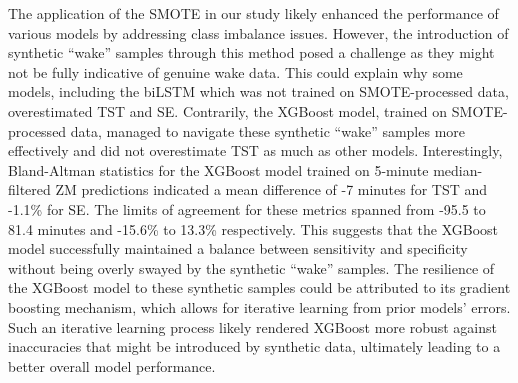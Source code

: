 \documentclass[
  9pt,
]{scrbook}
\begin{document}
The application of the SMOTE in our study likely enhanced the
performance of various models by addressing class imbalance issues.
However, the introduction of synthetic ``wake'' samples through this
method posed a challenge as they might not be fully indicative of
genuine wake data. This could explain why some models, including the
biLSTM which was not trained on SMOTE-processed data, overestimated TST
and SE. Contrarily, the XGBoost model, trained on SMOTE-processed data,
managed to navigate these synthetic ``wake'' samples more effectively
and did not overestimate TST as much as other models. Interestingly,
Bland-Altman statistics for the XGBoost model trained on 5-minute
median-filtered ZM predictions indicated a mean difference of -7 minutes
for TST and -1.1\% for SE. The limits of agreement for these metrics
spanned from -95.5 to 81.4 minutes and -15.6\% to 13.3\% respectively.
This suggests that the XGBoost model successfully maintained a balance
between sensitivity and specificity without being overly swayed by the
synthetic ``wake'' samples. The resilience of the XGBoost model to these
synthetic samples could be attributed to its gradient boosting
mechanism, which allows for iterative learning from prior models'
errors. Such an iterative learning process likely rendered XGBoost more
robust against inaccuracies that might be introduced by synthetic data,
ultimately leading to a better overall model performance.
\end{document}
